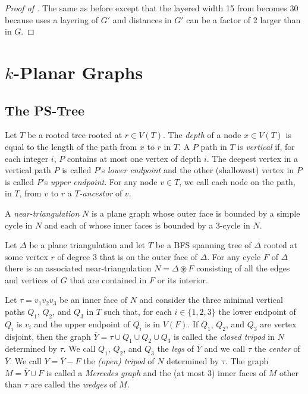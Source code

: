 \documentclass{patmorin}
\begin{document}
\begin{proof}[Proof of ]
  The same as before except that the layered width 15 from  becomes 30 because  uses a layering of $G'$ and distances in $G'$ can be a factor of 2 larger than in $G$.
\end{proof}

\section{$k$-Planar Graphs}

\subsection{The PS-Tree}

Let $T$ be a rooted tree rooted at $r\in V(T)$. The \emph{depth} of a node $x\in V(T)$ is equal to the length of the path from $x$ to $r$ in $T$. A $P$ path in $T$ is \emph{vertical} if, for each integer $i$, $P$ contains at most one vertex of depth $i$.  The deepest vertex in a vertical path $P$ is called  $P$'s \emph{lower endpoint} and the other (shallowest) vertex in $P$ is called $P$'s \emph{upper endpoint}. For any node $v\in T$, we call each node on the path, in $T$, from $v$ to $r$ a \emph{$T$-ancestor} of $v$.

A \emph{near-triangulation} $N$ is a plane graph whose outer face is bounded by a simple cycle in $N$ and each of whose inner faces is bounded by a 3-cycle in $N$.  

Let $\Delta$ be a plane triangulation and let $T$ be a BFS spanning tree of $\Delta$ rooted at some vertex $r$ of degree 3 that is on the outer face of $\Delta$.  For any cycle $F$ of $\Delta$ there is an associated near-triangulation $N=\Delta\circledast F$ consisting of all the edges and vertices of $G$ that are contained in $F$ or its interior.

Let $\tau=v_1v_2v_3$ be an inner face of $N$ and consider the three minimal vertical paths $Q_1$, $Q_2$, and $Q_3$ in $T$ such that, for each $i\in\{1,2,3\}$ the lower endpoint of $Q_i$ is $v_i$ and the upper endpoint of $Q_i$ is in $V(F)$.  If $Q_1$, $Q_2$, and $Q_3$ are vertex disjoint, then the graph $\overline{Y}=\tau\cup Q_1\cup Q_2\cup Q_3$ is called the \emph{closed tripod} in $N$ determined by $\tau$.  We call $Q_1$, $Q_2$, and $Q_3$ the \emph{legs} of $\overline{Y}$ and we call $\tau$ the \emph{center} of $\overline{Y}$.  We call $Y=\overline{Y}-F$ the \emph{(open) tripod} of $N$ determined by $\tau$.  The graph $M=\overline{Y}\cup F$ is called a \emph{Mercedes graph} and the (at most 3) inner faces of $M$ other than $\tau$ are called the \emph{wedges} of $M$.
\end{document}
